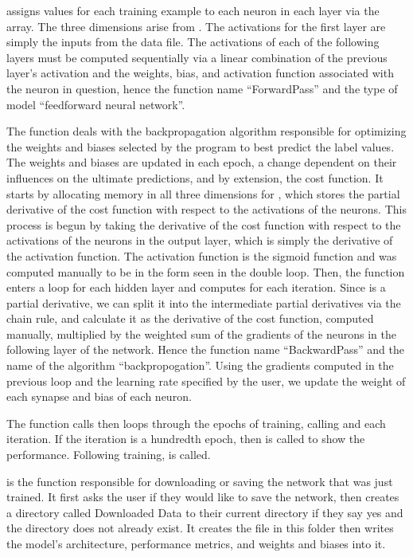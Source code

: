 \documentclass[12pt]{article}
\begin{document}
 assigns values for each training example to each neuron in each layer via the  array. The three dimensions arise from . The activations for the first layer are simply the inputs from the data file. The activations of each of the following layers must be computed sequentially via a linear combination of the previous layer’s activation and the weights, bias, and activation function associated with the neuron in question, hence the function name “ForwardPass” and the type of model “feedforward neural network”.

The  function deals with the backpropagation algorithm responsible for optimizing the weights and biases selected by the program to best predict the label values. The weights and biases are updated in each epoch, a change dependent on their influences on the ultimate predictions, and by extension, the cost function. It starts by allocating memory in all three dimensions for , which stores the partial derivative of the cost function with respect to the activations of the neurons. This process is begun by taking the derivative of the cost function with respect to the activations of the neurons in the output layer, which is simply the derivative of the activation function. The activation function is the sigmoid function and was computed manually to be in the form seen in the double  loop. Then, the function enters a loop for each hidden layer and computes  for each iteration. Since  is a partial derivative, we can split it into the intermediate partial derivatives via the chain rule, and calculate it as the derivative of the cost function, computed manually, multiplied by the weighted sum of the gradients of the neurons in the following layer of the network. Hence the function name “BackwardPass” and the name of the algorithm “backpropogation”. Using the gradients computed in the previous loop and the learning rate specified by the user, we update the weight of each synapse and bias of each neuron.

The  function calls  then loops through the epochs of training, calling  and  each iteration. If the iteration is a hundredth epoch, then  is called to show the performance. Following training,  is called.

 is the function responsible for downloading or saving the network that was just trained. It first asks the user if they would like to save the network, then creates a directory called Downloaded Data to their current directory if they say yes and the directory does not already exist. It creates the file  in this folder then writes the model’s architecture, performance metrics, and weights and biases into it.
\end{document}
